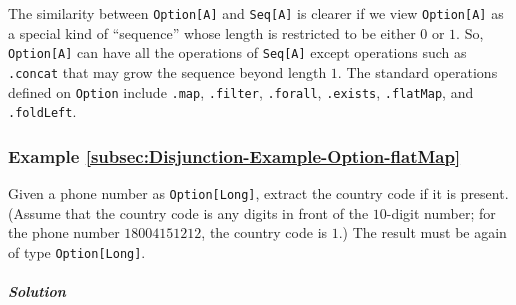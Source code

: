 The similarity between \lstinline!Option[A]! and \lstinline!Seq[A]!
is clearer if we view \lstinline!Option[A]! as a special kind of
``sequence'' whose length is restricted to be either $0$ or $1$.
So, \lstinline!Option[A]! can have all the operations of \lstinline!Seq[A]!
except operations such as \lstinline!.concat! that may grow the sequence
beyond length $1$. The standard operations defined on \lstinline!Option!
include \lstinline!.map!, \lstinline!.filter!, \lstinline!.forall!,
\lstinline!.exists!, \lstinline!.flatMap!, and \lstinline!.foldLeft!.

\subsubsection{Example \label{subsec:Disjunction-Example-Option-flatMap}\ref{subsec:Disjunction-Example-Option-flatMap}}

Given a phone number as \lstinline!Option[Long]!, extract the country
code if it is present. (Assume that the country code is any digits
in front of the $10$-digit number; for the phone number $18004151212$,
the country code is $1$.) The result must be again of type \lstinline!Option[Long]!.

\subparagraph{Solution}

